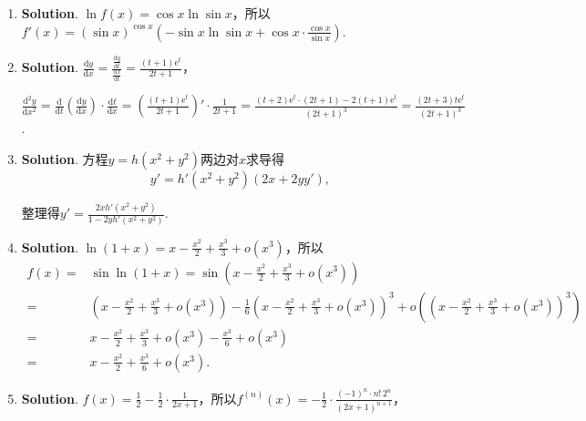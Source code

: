 \documentclass[../Main.tex]{subfiles}
\begin{document}
\begin{enumerate}
    \item \textbf{Solution}. $\ln f(x) =\cos x\ln\sin x$，所以$f'(x)=\left(\sin x
              \right)^{\cos x}\left(-\sin x\ln\sin x+\cos x\cdot\frac{\cos x}{\sin x}\right
              )$.

    \item \textbf{Solution}. $\frac{\mathrm{d}y}{\mathrm{d}x}=\frac{\frac{\mathrm{d}y}{\mathrm{d}t}}{\frac{\mathrm{d}x}{\mathrm{d}t}}
              =\frac{(t+1)\mathrm{e}^{t}}{2t+1}$，

          $\frac{\mathrm{d}^{2}y}{\mathrm{d}x^{2}}=\frac{\mathrm{d}}{\mathrm{d}t}\left
              (\frac{\mathrm{d}y}{\mathrm{d}x}\right)\cdot\frac{\mathrm{d}t}{\mathrm{d}x}
              =\left(\frac{(t+1)\mathrm{e}^{t}}{2t+1}\right)'\cdot\frac{1}{2t+1}=\frac{(t+2)\mathrm{e}^{t}\cdot(2t+1)-2(t+1)\mathrm{e}^{t}}{(2t+1)^{3}}
              =\frac{(2t+3)t\mathrm{e}^{t}}{(2t+1)^{3}}$.

    \item \textbf{Solution}. 方程$y=h(x^{2}+y^{2})$两边对$x$求导得
          \[
              y'=h'(x^{2}+y^{2})(2x+2yy'),
          \]

          整理得$y'=\frac{2xh'(x^{2}+y^{2})}{1-2yh'(x^{2}+y^{2})}$.

    \item \textbf{Solution}. $\ln(1+x)=x-\frac{x^{2}}{2}+\frac{x^{3}}{3}+o(x^{3})$，所以
          \[
              \begin{aligned}
                  f(x) = & \sin\ln(1+x)=\sin\left(x-\frac{x^2}{2}+\frac{x^3}{3}+o(x^{3})\right)                                                                                                                         \\
                  =      & \left(x-\frac{x^2}{2}+\frac{x^3}{3}+o(x^{3})\right)-\frac{1}{6}\left(x-\frac{x^2}{2}+\frac{x^3}{3}+o(x^{3})\right)^{3}+o\left(\left(x-\frac{x^2}{2}+\frac{x^3}{3}+o(x^{3})\right)^{3}\right) \\
                  =      & x-\frac{x^2}{2}+\frac{x^3}{3}+o(x^{3})-\frac{x^3}{6}+o(x^{3})                                                                                                                                \\
                  =      & x-\frac{x^2}{2}+\frac{x^3}{6}+o(x^{3}).
              \end{aligned}
          \]

    \item \textbf{Solution}. $f(x)=\frac{1}{2}-\frac{1}{2}\cdot\frac{1}{2x+1}$，所以$f
                  ^{(n)}(x)=-\frac{1}{2}\cdot\frac{(-1)^{n}\cdot n!\,2^{n}}{(2x+1)^{n+1}}$，


\end{enumerate}
\end{document}
